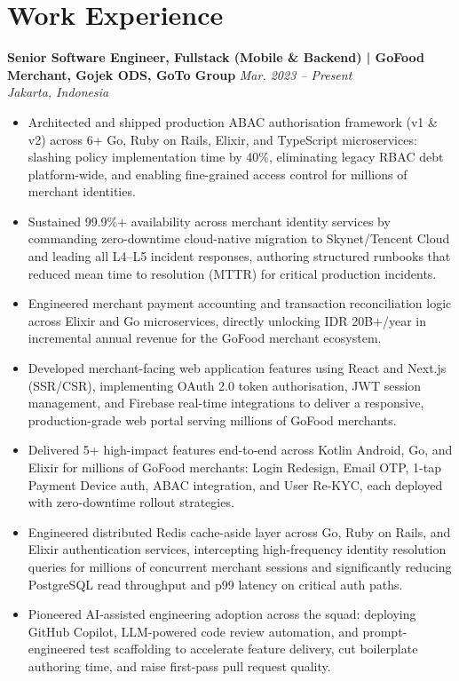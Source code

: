 \documentclass[10pt]{article}
\begin{document}
\section*{Work Experience}

\textbf{Senior Software Engineer, Fullstack (Mobile \& Backend) | GoFood Merchant, Gojek ODS, GoTo Group} \hfill \textit{Mar. 2023 -- Present}\\
\textit{Jakarta, Indonesia}
\begin{itemize}
\item Architected and shipped production ABAC authorisation framework (v1 \& v2) across 6+ Go, Ruby on Rails, Elixir, and TypeScript microservices: slashing policy implementation time by 40\%, eliminating legacy RBAC debt platform-wide, and enabling fine-grained access control for millions of merchant identities.
\item Sustained 99.9\%+ availability across merchant identity services by commanding zero-downtime cloud-native migration to Skynet/Tencent Cloud and leading all L4--L5 incident responses, authoring structured runbooks that reduced mean time to resolution (MTTR) for critical production incidents.
\item Engineered merchant payment accounting and transaction reconciliation logic across Elixir and Go microservices, directly unlocking IDR 20B+/year in incremental annual revenue for the GoFood merchant ecosystem.
\item Developed merchant-facing web application features using React and Next.js (SSR/CSR), implementing OAuth 2.0 token authorisation, JWT session management, and Firebase real-time integrations to deliver a responsive, production-grade web portal serving millions of GoFood merchants.
\item Delivered 5+ high-impact features end-to-end across Kotlin Android, Go, and Elixir for millions of GoFood merchants: Login Redesign, Email OTP, 1-tap Payment Device auth, ABAC integration, and User Re-KYC, each deployed with zero-downtime rollout strategies.
\item Engineered distributed Redis cache-aside layer across Go, Ruby on Rails, and Elixir authentication services, intercepting high-frequency identity resolution queries for millions of concurrent merchant sessions and significantly reducing PostgreSQL read throughput and p99 latency on critical auth paths.
\item Pioneered AI-assisted engineering adoption across the squad: deploying GitHub Copilot, LLM-powered code review automation, and prompt-engineered test scaffolding to accelerate feature delivery, cut boilerplate authoring time, and raise first-pass pull request quality.
\end{itemize}
\end{document}
